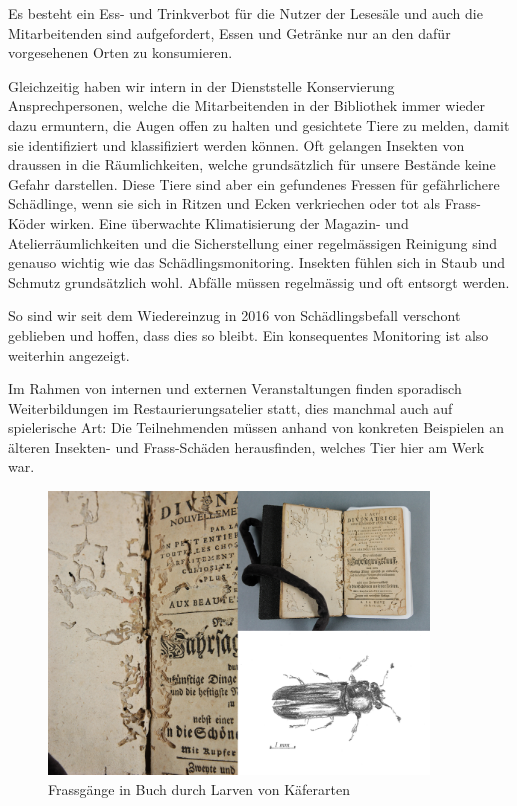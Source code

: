 \documentclass[a4paper,
fontsize=11pt,
oneside,
numbers=noperiodatend,
parskip=half-,
bibliography=totoc,
final
]{scrartcl}
\begin{document}
Es besteht ein Ess- und Trinkverbot für die Nutzer der Lesesäle und auch
die Mitarbeitenden sind aufgefordert, Essen und Getränke nur an den
dafür vorgesehenen Orten zu konsumieren.

Gleichzeitig haben wir intern in der Dienststelle Konservierung
Ansprechpersonen, welche die Mitarbeitenden in der Bibliothek immer
wieder dazu ermuntern, die Augen offen zu halten und gesichtete Tiere zu
melden, damit sie identifiziert und klassifiziert werden können. Oft
gelangen Insekten von draussen in die Räumlichkeiten, welche
grundsätzlich für unsere Bestände keine Gefahr darstellen. Diese Tiere
sind aber ein gefundenes Fressen für gefährlichere Schädlinge, wenn sie
sich in Ritzen und Ecken verkriechen oder tot als Frass-Köder wirken.
Eine überwachte Klimatisierung der Magazin- und Atelierräumlichkeiten
und die Sicherstellung einer regelmässigen Reinigung sind genauso
wichtig wie das Schädlingsmonitoring. Insekten fühlen sich in Staub und
Schmutz grundsätzlich wohl. Abfälle müssen regelmässig und oft entsorgt
werden.

So sind wir seit dem Wiedereinzug in 2016 von Schädlingsbefall verschont
geblieben und hoffen, dass dies so bleibt. Ein konsequentes Monitoring
ist also weiterhin angezeigt.

Im Rahmen von internen und externen Veranstaltungen finden sporadisch
Weiterbildungen im Restaurierungsatelier statt, dies manchmal auch auf
spielerische Art: Die Teilnehmenden müssen anhand von konkreten
Beispielen an älteren Insekten- und Frass-Schäden herausfinden, welches
Tier hier am Werk war.

\begin{figure}[h!]
\centering
\includegraphics[width=0.9\textwidth]{img/image3.png}
\caption{ Frassgänge in Buch durch Larven von Käferarten}
\end{figure}
\end{document}
